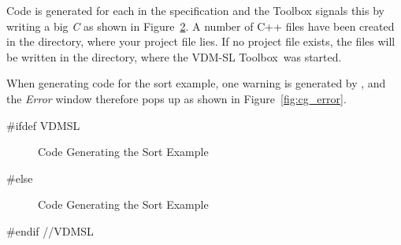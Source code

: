 \documentclass[\pformat,12pt]{article}
\newcommand{\ToolboxName}{VDM-SL Toolbox}
\newcommand{\ToolboxName}{VDM++ Toolbox}
\begin{document}
Code is generated for each  in the specification and the
Toolbox signals this by writing a big {\em \large{C}} as shown in
Figure~\ref{fig:cg2}. A number of C++ files have been created in the
directory, where your project file lies. If no project file exists,
the files will be written in the directory, where the \ToolboxName\ was
started.

When generating code for the sort example, one warning is generated by
\tcg{}, and the {\em Error} window therefore pops up as
shown in Figure~\ref{fig:cg_error}.

#ifdef VDMSL
\begin{figure}[tbh]
\begin{center}
\mbox{}
\caption{Code Generating the Sort Example}\label{fig:cg2}
\end{center}
\end{figure}
#else
\begin{figure}[tbh]
\begin{center}
\mbox{}
\caption{Code Generating the Sort Example}\label{fig:cg2}
\end{center}
\end{figure}
#endif //VDMSL
\end{document}
